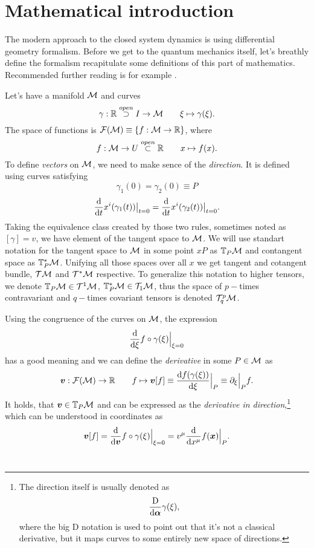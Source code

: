 \chapter{Mathematical introduction}
The modern approach to the closed system dynamics is using differential geometry formalism. Before we get to the quantum mechanics itself, let's breathly define the formalism recapitulate some definitions of this part of mathematics. Recommended further reading is for example \citep{fecko}.

Let's have a manifold $\mathcal{M}$ and curves 
$$\gamma:\mathbb{R} \overset{open}{\supset} I \rightarrow \mathcal{M} \qquad \xi\mapsto \gamma(\xi).$$ 
The space of functions is $\mathcal{F}(\mathcal{M})\equiv\{f:\mathcal{M}\rightarrow \mathbb{R}\}$, where 
$$f:\mathcal{M}\rightarrow U\overset{open}{\subset} \mathbb{R} \qquad x\mapsto f(x).$$
To define \emph{vectors} on $\mathcal{M}$, we need to make sence of the \emph{direction}. It is defined using curves satisfying 
$$\gamma_1(0)=\gamma_2(0)\equiv P$$
$$\frac{\mathrm{d} }{\mathrm{d} t}x^i(\gamma_1(t))\big|_{t=0}=\frac{\mathrm{d} }{\mathrm{d} t}x^i(\gamma_2(t))\big|_{t=0}.$$
Taking the equivalence class created by those two rules, sometimes noted as $[\gamma]=v$, we have element of the tangent space to $\mathcal{M}$. We will use standart notation for the tangent space to $\mathcal{M}$ in some point $xP$ as $\mathbb{T}_P\mathcal{M}$ and contangent space as $\mathbb{T}^*_P\mathcal{M}$. Unifying all those spaces over all $x$ we get tangent and cotangent bundle, $\mathcal{T}\mathcal{M}$ and $\mathcal{T}^*\mathcal{M}$ respective. To generalize this notation to higher tensors, we denote $\mathbb{T}_P\mathcal{M}\in \mathcal{T}^1\mathcal{M}$, $\mathbb{T}^*_P\mathcal{M}\in \mathcal{T}_1\mathcal{M}$, thus the space of $p-$times contravariant and $q-$times covariant tensors is denoted $\mathcal{T}^p_q\mathcal{M}$.

Using the congruence of the curves on $\mathcal{M}$, the expression 
\begin{equation}
    \frac{\mathrm{d} }{\mathrm{d} \xi}f\circ \gamma(\xi)\Big|_{\xi=0}
\end{equation}
has a good meaning and we can define the \emph{derivative} in some $P\in\mathcal{M}$ as
\begin{equation}
    \bm v: \mathcal{F}(\mathcal{M})\rightarrow \mathbb{R} \qquad f\mapsto \bm v[f]\equiv \frac{\mathrm{d} f(\gamma(\xi))}{\mathrm{d} \xi}\Big|_P \equiv \partial_\xi\Big|_P f .
\end{equation}
It holds, that $\bm v\in \mathbb{T}_P\mathcal{M}$ and can be expressed as the \emph{derivative in direction},\footnote{
        The direction itself is usually denoted as
        \begin{equation}
            \frac{\mathrm{D}}{\mathrm{d}\bm\alpha}\gamma(\xi),
        \end{equation}
        where the big D notation is used to point out that it's not a classical derivative, but it maps curves to some entirely new space of directions.
    } 
which can be understood in coordinates as
\begin{equation}
    \bm v[f] = \frac{\mathrm{d} }{\mathrm{d} \bm v} f\circ \gamma(\xi)\Big|_{\xi=0}=v^\mu\frac{\mathrm{d} }{\mathrm{d} x^\mu} f(\bm x)\Big|_{P}.
\end{equation}\




